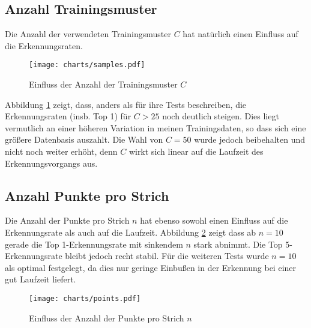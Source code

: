 \subsection{Anzahl Trainingsmuster} %
\label{sub:anzahl_trainingsmuster}

Die Anzahl der verwendeten Trainingsmuster $C$ hat natürlich einen Einfluss auf die Erkennungsraten.

\begin{figure}[htbp]
  \begin{center}
    \texttt{[image: charts/samples.pdf]}
  \end{center}
  \caption{Einfluss der Anzahl der Trainingsmuster $C$}
  \label{chart:samples}
\end{figure}

Abbildung \ref{chart:samples} zeigt, dass, anders als \citet{Golubitsky:2009p1842} für ihre Tests beschreiben, die Erkennungsraten (insb. Top 1) für $C > 25$ noch deutlich steigen. Dies liegt vermutlich an einer höheren Variation in meinen Trainingsdaten, so dass sich eine größere Datenbasis auszahlt. Die Wahl von $C=50$ wurde jedoch beibehalten und nicht noch weiter erhöht, denn $C$ wirkt sich linear auf die Laufzeit des Erkennungsvorgangs aus.

\subsection{Anzahl Punkte pro Strich} %
\label{sub:anzahl_punkte_pro_strich}

Die Anzahl der Punkte pro Strich $n$ hat ebenso sowohl einen Einfluss auf die Erkennungsrate als auch auf die Laufzeit. Abbildung \ref{chart:points} zeigt dass ab $n=10$ gerade die Top 1-Erkennungsrate mit sinkendem $n$ stark abnimmt. Die Top 5-Erkennungsrate bleibt jedoch recht stabil. Für die weiteren Tests wurde $n=10$ als optimal festgelegt, da dies nur geringe Einbußen in der Erkennung bei einer gut Laufzeit liefert.

\begin{figure}[htbp]
  \begin{center}
    \texttt{[image: charts/points.pdf]}
  \end{center}
  \caption{Einfluss der Anzahl der Punkte pro Strich $n$}
  \label{chart:points}
\end{figure}


